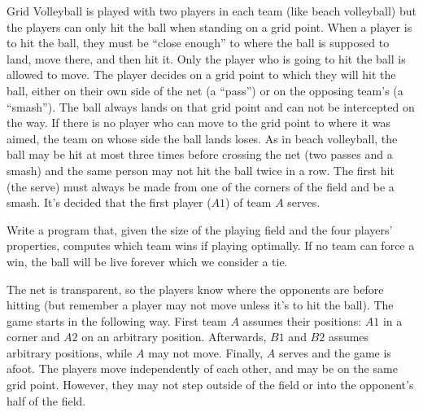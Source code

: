Grid Volleyball is played with two players in each team (like beach volleyball) but the players can only hit the ball when standing on a grid point.
When a player is to hit the ball, they must be ``close enough'' to where the ball is supposed to land, move there, and then hit it.
Only the player who is going to hit the ball is allowed to move.
The player decides on a grid point to which they will hit the ball, either on their own side of the net (a ``pass'') or on the opposing team's (a ``smash'').
The ball always lands on that grid point and can not be intercepted on the way.
If there is no player who can move to the grid point to where it was aimed, the team on whose side the ball lands loses.
As in beach volleyball, the ball may be hit at most three times before crossing the net (two passes and a smash) and the same person may not hit the ball twice in a row.
The first hit (the serve) must always be made from one of the corners of the field and be a smash.
It's decided that the first player ($A1$) of team $A$ serves.

Write a program that, given the size of the playing field and the four players' properties, computes which team wins if playing optimally.
If no team can force a win, the ball will be live forever which we consider a tie.

The net is transparent, so the players know where the opponents are before hitting (but remember a player may not move unless it's to hit the ball).
The game starts in the following way.
First team $A$ assumes their positions: $A1$ in a corner and $A2$ on an arbitrary position.
Afterwards, $B1$ and $B2$ assumes arbitrary positions, while $A$ may not move.
Finally, $A$ serves and the game is afoot.
The players move independently of each other, and may be on the same grid point.
However, they may not step outside of the field or into the opponent's half of the field.

